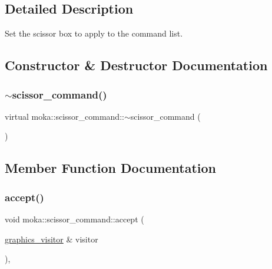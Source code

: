 \subsection{Detailed Description}
Set the scissor box to apply to the command list. 

\subsection{Constructor \& Destructor Documentation}
\mbox{\label{classmoka_1_1scissor__command_aebc1d84e16d381d8ff49c5c360dbcb47}} 
\subsubsection{\texorpdfstring{$\sim$scissor\_command()}{~scissor\_command()}}
{\footnotesize\ttfamily virtual moka\+::scissor\+\_\+command\+::$\sim$scissor\+\_\+command (\begin{DoxyParamCaption}{ }\end{DoxyParamCaption})\hspace{0.3cm}{\ttfamily [virtual]}}



\subsection{Member Function Documentation}
\mbox{\label{classmoka_1_1scissor__command_aae68551e35f929ea61bae3640af68ed8}} 
\subsubsection{\texorpdfstring{accept()}{accept()}}
{\footnotesize\ttfamily void moka\+::scissor\+\_\+command\+::accept (\begin{DoxyParamCaption}\item[{\mbox{\hyperlink{classmoka_1_1graphics__visitor}{graphics\+\_\+visitor}} \&}]{visitor }\end{DoxyParamCaption})\hspace{0.3cm}{\ttfamily [override]}, {\ttfamily [virtual]}}



